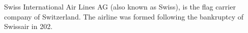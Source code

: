 Swiss International Air Lines AG (also known as Swiss), is the flag carrier company of Switzerland.
The airline was formed following the bankruptcy of Swissair in 202.